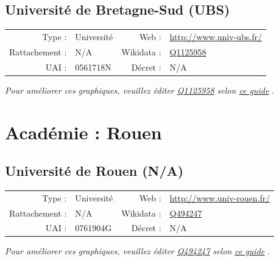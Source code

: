 \documentclass[12pt,french,landscape]{article}
\begin{document}
\newpage

\hypertarget{universituxe9-de-bretagne-sud-ubs}{%
\subsection{Université de Bretagne-Sud
(UBS)}\label{universituxe9-de-bretagne-sud-ubs}}

\begin{tabular*}{0.45\textwidth}{rp{2cm}rl}  
\hline  
Type : & Université & Web : &\href{http://www.univ-ubs.fr/}{http://www.univ-ubs.fr/} \\  
Rattachement : & N/A & Wikidata : & \href{https://www.wikidata.org/entity/Q1125958}{Q1125958} \\  
UAI : & 0561718N & Décret : & N/A \\  
\hline  
\end{tabular*}

\textit{\scriptsize Pour améliorer ces graphiques, veuillez éditer \href{https://www.wikidata.org/entity/Q1125958}{Q1125958}  selon \href{https://github.com/cpesr/wikidataESR/blob/master/Rmd/wikidataESR.md}{ce guide}}
.


\newpage

\hypertarget{acaduxe9mie-rouen}{%
\section{Académie : Rouen}\label{acaduxe9mie-rouen}}

\hypertarget{universituxe9-de-rouen-na}{%
\subsection{Université de Rouen (N/A)}\label{universituxe9-de-rouen-na}}

\begin{tabular*}{0.45\textwidth}{rp{2cm}rl}  
\hline  
Type : & Université & Web : &\href{http://www.univ-rouen.fr/}{http://www.univ-rouen.fr/} \\  
Rattachement : & N/A & Wikidata : & \href{https://www.wikidata.org/entity/Q494247}{Q494247} \\  
UAI : & 0761904G & Décret : & N/A \\  
\hline  
\end{tabular*}

\textit{\scriptsize Pour améliorer ces graphiques, veuillez éditer \href{https://www.wikidata.org/entity/Q494247}{Q494247}  selon \href{https://github.com/cpesr/wikidataESR/blob/master/Rmd/wikidataESR.md}{ce guide}}
.
\end{document}
